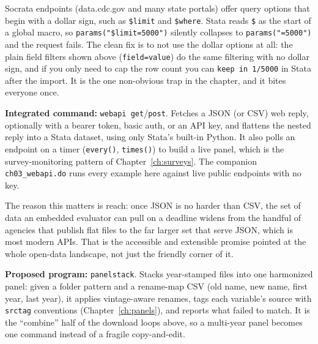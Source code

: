 \documentclass[
    a4paper,
    fontsize=10pt,
    twoside=true,
    numbers=noenddot,
]{kaobook}
\newenvironment{vizcallout}[1][Visualization to build]{%
    \begin{vizbox}[frametitle={#1}]%
}{%
    \end{vizbox}%
}
\begin{document}
\begin{vizcallout}[The one JSON trap in Stata: the \$ sign]
Socrata endpoints (data.cdc.gov and many state portals) offer query options that begin with a dollar sign, such as \texttt{\$limit} and \texttt{\$where}. Stata reads \texttt{\$} as the start of a global macro, so \texttt{params("\$limit=5000")} silently collapses to \texttt{params("=5000")} and the request fails. The clean fix is to not use the dollar options at all: the plain field filters shown above (\texttt{field=value}) do the same filtering with no dollar sign, and if you only need to cap the row count you can \texttt{keep in 1/5000} in Stata after the import. It is the one non-obvious trap in the chapter, and it bites everyone once.
\end{vizcallout}

\begin{kaobox}[frametitle=Package Integration: \texttt{webapi}]
\textbf{Integrated command:} \texttt{webapi get}/\texttt{post}. Fetches a JSON (or CSV) web reply, optionally with a bearer token, basic auth, or an API key, and flattens the nested reply into a Stata dataset, using only Stata's built-in Python. It also polls an endpoint on a timer (\texttt{every()}, \texttt{times()}) to build a live panel, which is the survey-monitoring pattern of Chapter~\ref{ch:surveys}. The companion \texttt{ch03\_webapi.do} runs every example here against live public endpoints with no key.
\end{kaobox}

The reason this matters is reach: once JSON is no harder than CSV, the set of data an embedded evaluator can pull on a deadline widens from the handful of agencies that publish flat files to the far larger set that serve JSON, which is most modern APIs. That is the accessible and extensible promise pointed at the whole open-data landscape, not just the friendly corner of it.

\begin{kaobox}[frametitle=Ado-file Idea: \texttt{panelstack}]
\textbf{Proposed program:} \texttt{panelstack}. Stacks year-stamped files into one harmonized panel: given a folder pattern and a rename-map CSV (old name, new name, first year, last year), it applies vintage-aware renames, tags each variable's source with \texttt{srctag} conventions (Chapter~\ref{ch:panels}), and reports what failed to match. It is the \enquote{combine} half of the download loops above, so a multi-year panel becomes one command instead of a fragile copy-and-edit.
\end{kaobox}
\end{document}
